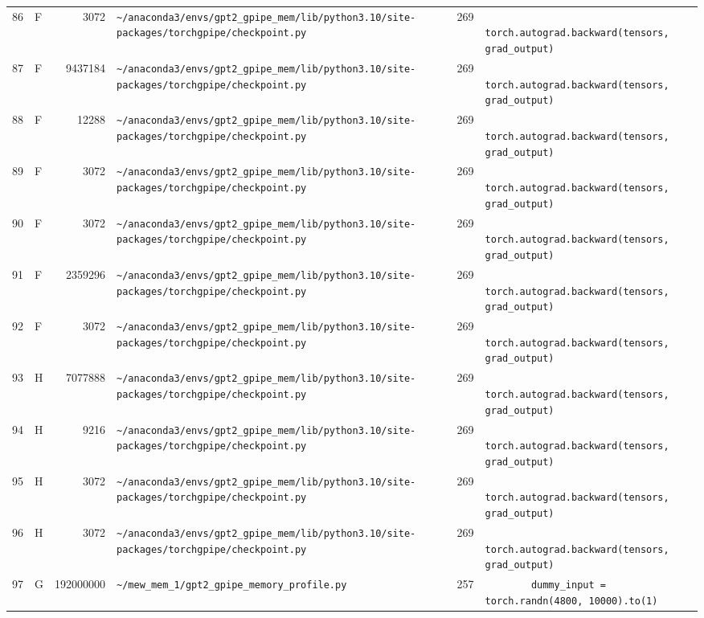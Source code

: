 \documentclass{article}
\begin{document}
\begin{longtable}{r l r p{6.5cm} r p{7.0cm}}
86 & F & 3072 & \lstinline|~/anaconda3/envs/gpt2_gpipe_mem/lib/python3.10/site-packages/torchgpipe/checkpoint.py| & 269 & \lstinline|            torch.autograd.backward(tensors, grad_output)| \\
87 & F & 9437184 & \lstinline|~/anaconda3/envs/gpt2_gpipe_mem/lib/python3.10/site-packages/torchgpipe/checkpoint.py| & 269 & \lstinline|            torch.autograd.backward(tensors, grad_output)| \\
88 & F & 12288 & \lstinline|~/anaconda3/envs/gpt2_gpipe_mem/lib/python3.10/site-packages/torchgpipe/checkpoint.py| & 269 & \lstinline|            torch.autograd.backward(tensors, grad_output)| \\
89 & F & 3072 & \lstinline|~/anaconda3/envs/gpt2_gpipe_mem/lib/python3.10/site-packages/torchgpipe/checkpoint.py| & 269 & \lstinline|            torch.autograd.backward(tensors, grad_output)| \\
90 & F & 3072 & \lstinline|~/anaconda3/envs/gpt2_gpipe_mem/lib/python3.10/site-packages/torchgpipe/checkpoint.py| & 269 & \lstinline|            torch.autograd.backward(tensors, grad_output)| \\
91 & F & 2359296 & \lstinline|~/anaconda3/envs/gpt2_gpipe_mem/lib/python3.10/site-packages/torchgpipe/checkpoint.py| & 269 & \lstinline|            torch.autograd.backward(tensors, grad_output)| \\
92 & F & 3072 & \lstinline|~/anaconda3/envs/gpt2_gpipe_mem/lib/python3.10/site-packages/torchgpipe/checkpoint.py| & 269 & \lstinline|            torch.autograd.backward(tensors, grad_output)| \\
93 & H & 7077888 & \lstinline|~/anaconda3/envs/gpt2_gpipe_mem/lib/python3.10/site-packages/torchgpipe/checkpoint.py| & 269 & \lstinline|            torch.autograd.backward(tensors, grad_output)| \\
94 & H & 9216 & \lstinline|~/anaconda3/envs/gpt2_gpipe_mem/lib/python3.10/site-packages/torchgpipe/checkpoint.py| & 269 & \lstinline|            torch.autograd.backward(tensors, grad_output)| \\
95 & H & 3072 & \lstinline|~/anaconda3/envs/gpt2_gpipe_mem/lib/python3.10/site-packages/torchgpipe/checkpoint.py| & 269 & \lstinline|            torch.autograd.backward(tensors, grad_output)| \\
96 & H & 3072 & \lstinline|~/anaconda3/envs/gpt2_gpipe_mem/lib/python3.10/site-packages/torchgpipe/checkpoint.py| & 269 & \lstinline|            torch.autograd.backward(tensors, grad_output)| \\
97 & G & 192000000 & \lstinline|~/mew_mem_1/gpt2_gpipe_memory_profile.py| & 257 & \lstinline|        dummy_input = torch.randn(4800, 10000).to(1)| \\

\end{longtable}
\end{document}
